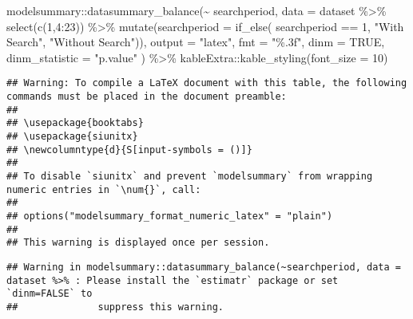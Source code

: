 \documentclass[
]{article}
\newenvironment{Shaded}{\begin{snugshade}}{\end{snugshade}}
\newcommand{\AttributeTok}[1]{\textcolor[rgb]{0.77,0.63,0.00}{#1}}
\newcommand{\ConstantTok}[1]{\textcolor[rgb]{0.00,0.00,0.00}{#1}}
\newcommand{\DecValTok}[1]{\textcolor[rgb]{0.00,0.00,0.81}{#1}}
\newcommand{\FunctionTok}[1]{\textcolor[rgb]{0.00,0.00,0.00}{#1}}
\newcommand{\NormalTok}[1]{#1}
\newcommand{\SpecialCharTok}[1]{\textcolor[rgb]{0.00,0.00,0.00}{#1}}
\newcommand{\StringTok}[1]{\textcolor[rgb]{0.31,0.60,0.02}{#1}}
\let\oldShaded\Shaded
\let\endoldShaded\endShaded
\renewenvironment{Shaded}{\footnotesize\oldShaded}{\endoldShaded}
\begin{document}
\begin{Shaded}
\begin{Highlighting}[]
\NormalTok{modelsummary}\SpecialCharTok{::}\FunctionTok{datasummary\_balance}\NormalTok{(}\SpecialCharTok{\textasciitilde{}}\NormalTok{ searchperiod,}
                                  \AttributeTok{data =}\NormalTok{ dataset }\SpecialCharTok{\%\textgreater{}\%}
                                      \FunctionTok{select}\NormalTok{(}\FunctionTok{c}\NormalTok{(}\DecValTok{1}\NormalTok{,}\DecValTok{4}\SpecialCharTok{:}\DecValTok{23}\NormalTok{)) }\SpecialCharTok{\%\textgreater{}\%}
                                      \FunctionTok{mutate}\NormalTok{(}\AttributeTok{searchperiod =} \FunctionTok{if\_else}\NormalTok{(}
\NormalTok{                                          searchperiod }\SpecialCharTok{==} \DecValTok{1}\NormalTok{,}
                                          \StringTok{"With Search"}\NormalTok{, }
                                          \StringTok{"Without Search"}\NormalTok{)), }
                                  \AttributeTok{output =} \StringTok{"latex"}\NormalTok{, }
                                  \AttributeTok{fmt =} \StringTok{"\%.3f"}\NormalTok{,}
                                  \AttributeTok{dinm =} \ConstantTok{TRUE}\NormalTok{,}
                                  \AttributeTok{dinm\_statistic =} \StringTok{"p.value"}
\NormalTok{                                    ) }\SpecialCharTok{\%\textgreater{}\%}
\NormalTok{    kableExtra}\SpecialCharTok{::}\FunctionTok{kable\_styling}\NormalTok{(}\AttributeTok{font\_size =} \DecValTok{10}\NormalTok{)}
\end{Highlighting}
\end{Shaded}

\begin{verbatim}
## Warning: To compile a LaTeX document with this table, the following commands must be placed in the document preamble:
## 
## \usepackage{booktabs}
## \usepackage{siunitx}
## \newcolumntype{d}{S[input-symbols = ()]}
## 
## To disable `siunitx` and prevent `modelsummary` from wrapping numeric entries in `\num{}`, call:
## 
## options("modelsummary_format_numeric_latex" = "plain")
## 
## This warning is displayed once per session.
\end{verbatim}

\begin{verbatim}
## Warning in modelsummary::datasummary_balance(~searchperiod, data = dataset %>% : Please install the `estimatr` package or set `dinm=FALSE` to
##              suppress this warning.
\end{verbatim}
\end{document}

